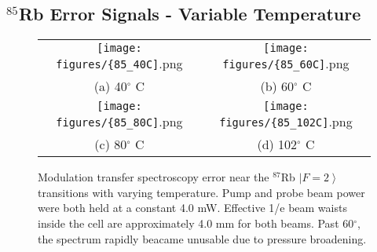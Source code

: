 \subsection{$^{85}$Rb Error Signals - Variable Temperature}
\begin{figure}[H]
  \begin{tabular}{cc}
    \texttt{[image: figures/\{85\_40C]}.png} &
    \texttt{[image: figures/\{85\_60C]}.png} \\
    (a) 40$^{\circ}$ C & (b) 60$^{\circ}$ C  \\[6pt]
    \texttt{[image: figures/\{85\_80C]}.png} &
    \texttt{[image: figures/\{85\_102C]}.png} \\
    (c) 80$^{\circ}$ C  & (d) 102$^{\circ}$ C  \\[6pt]
  \end{tabular}
  \caption{Modulation transfer spectroscopy error near the $^{87}$Rb $\left|F=2\right\rangle$ transitions with varying temperature. Pump and probe beam power were both held at a constant 4.0 mW. Effective 1/e beam waists inside the cell are approximately 4.0 mm for both beams. Past 60$^{\circ}$, the spectrum rapidly beacame unusable due to pressure broadening.}
\end{figure}
\newpage

